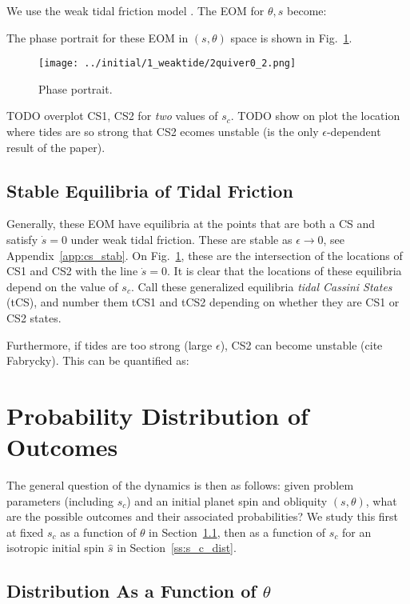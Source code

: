\documentclass[
        fleqn,
        usenatbib,
        referee,
    ]{mnras}
\newcommand*{\p}[1]{\left(#1\right)}
\begin{document}
We use the weak tidal friction model \citep{lai2012}. The EOM for $\theta, s$
become:

The phase portrait for these EOM in $\p{s, \theta}$ space is shown in
Fig.~\ref{fig:quiver}.
\begin{figure}[t]
    \centering
    \texttt{[image: ../initial/1\_weaktide/2quiver0\_2.png]}
    \caption{Phase portrait.}\label{fig:quiver}
\end{figure}

TODO overplot CS1, CS2 for \emph{two} values of $s_c$. TODO show on plot the location
where tides are so strong that CS2 ecomes unstable (is the only
$\epsilon$-dependent result of the paper).

\subsection{Stable Equilibria of Tidal Friction}\label{ss:tidal_eqs}

Generally, these EOM have equilibria at the points that are both a CS and
satisfy $\dot{s} = 0$ under weak tidal friction. These are stable as $\epsilon
\to 0$, see Appendix~\ref{app:cs_stab}. On Fig.~\ref{fig:quiver}, these are the
intersection of the locations of CS1 and CS2 with the line $\dot{s} = 0$. It is
clear that the locations of these equilibria depend on the value of $s_c$. Call
these generalized equilibria \emph{tidal Cassini States} (tCS), and number them
tCS1 and tCS2 depending on whether they are CS1 or CS2 states.

Furthermore, if tides are too strong (large $\epsilon$), CS2 can become
unstable (cite Fabrycky). This can be quantified as:

\section{Probability Distribution of Outcomes}\label{s:sim}

The general question of the dynamics is then as follows: given problem
parameters (including $s_c$) and an initial planet spin and obliquity $(s,
\theta)$, what are the possible outcomes and their associated probabilities? We
study this first at fixed $s_c$ as a function of $\theta$ in
Section~\ref{ss:q_dist}, then as a function of $s_c$ for an isotropic initial
spin $\hat{s}$ in Section~\ref{ss:s_c_dist}.

\subsection{Distribution As a Function of $\theta$}\label{ss:q_dist}
\end{document}
